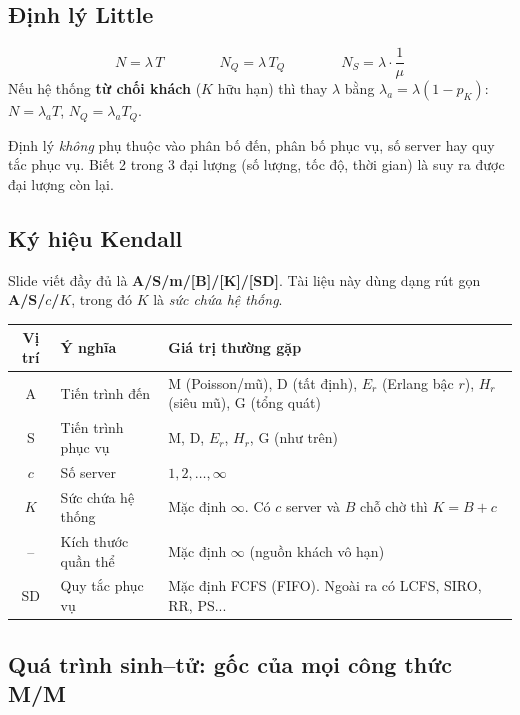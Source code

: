\subsection{Định lý Little}

\begin{congthuc}
\[
N = \lambda\,T \qquad\qquad N_Q = \lambda\,T_Q \qquad\qquad N_S = \lambda\cdot\frac{1}{\mu}
\]
Nếu hệ thống \textbf{từ chối khách} ($K$ hữu hạn) thì thay $\lambda$ bằng \textbf{$\lambda_a=\lambda(1-p_K)$}:\quad $N=\lambda_a T$, $N_Q = \lambda_a T_Q$.
\end{congthuc}

Định lý \emph{không} phụ thuộc vào phân bố đến, phân bố phục vụ, số server hay quy tắc phục vụ. Biết 2 trong 3 đại lượng (số lượng, tốc độ, thời gian) là suy ra được đại lượng còn lại.

\subsection{Ký hiệu Kendall}

Slide viết đầy đủ là \textbf{A/S/m/[B]/[K]/[SD]}. Tài liệu này dùng dạng rút gọn \textbf{A/S/$c$/$K$}, trong đó $K$ là \emph{sức chứa hệ thống}.

\begin{center}
\begin{tabularx}{\linewidth}{@{}c l X@{}}
\toprule
\textbf{Vị trí} & \textbf{Ý nghĩa} & \textbf{Giá trị thường gặp} \\
\midrule
A & Tiến trình đến & M (Poisson/mũ), D (tất định), $E_r$ (Erlang bậc $r$), $H_r$ (siêu mũ), G (tổng quát) \\
S & Tiến trình phục vụ & M, D, $E_r$, $H_r$, G (như trên) \\
$c$ & Số server & $1, 2, \dots, \infty$ \\
$K$ & Sức chứa hệ thống & Mặc định $\infty$. Có $c$ server và $B$ chỗ chờ thì $K = B + c$ \\
-- & Kích thước quần thể & Mặc định $\infty$ (nguồn khách vô hạn) \\
SD & Quy tắc phục vụ & Mặc định FCFS (FIFO). Ngoài ra có LCFS, SIRO, RR, PS... \\
\bottomrule
\end{tabularx}
\end{center}

\subsection{Quá trình sinh--tử: gốc của mọi công thức M/M}

